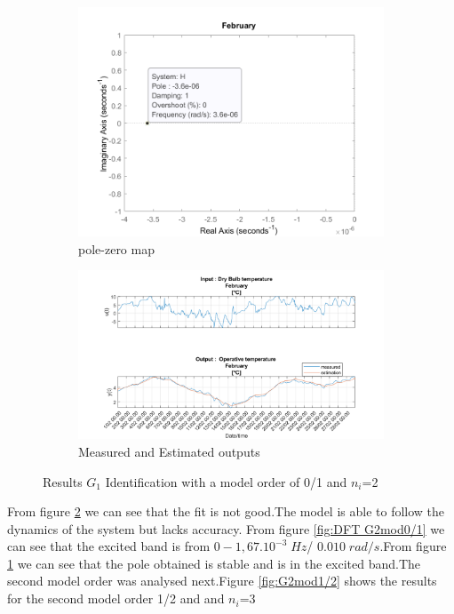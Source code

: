 \documentclass[a4paper,12pt]{report}
\numberwithin{equation}{section}
\begin{document}
\begin{figure}[H]\ContinuedFloat
\begin{subfigure}{\textwidth}
  \centering
  \includegraphics[width=.6\linewidth]{G2mod01pzmap.png}
  \caption{pole-zero map}
  \label{fig:pzmap G2mod0/1}
\end{subfigure}

\begin{subfigure}{\textwidth}
  \centering
  \includegraphics[width=\linewidth]{G2mod01InOut.png}
  \caption{Measured and Estimated outputs}
  \label{fig:inoutG20/1}
\end{subfigure}
\caption{Results $G_{1}$ Identification with a model order of 0/1 and $n_{i}$=2}
\label{fig:G2mod0/1}
\end{figure}
\FloatBarrier

\noindent
From figure \ref{fig:inoutG20/1} we can see that the fit is not good.The model is able to follow the dynamics of the system but lacks accuracy. From figure \ref{fig:DFT G2mod0/1} we can see that the excited band is from $0-1,67.10^{-3}\;Hz$/ $0.010\;rad/s$.From figure \ref{fig:pzmap G2mod0/1} we can see that the pole obtained is stable and is in the excited band.The second model order was analysed next.Figure \ref{fig:G2mod1/2} shows the results for the second model order 1/2 and and $n_{i}$=3
\end{document}
